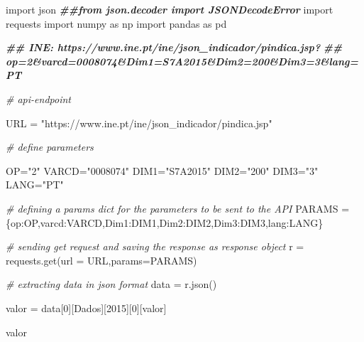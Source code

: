 \documentclass[
  12pt,
]{article}
\newenvironment{Shaded}{\begin{snugshade}}{\end{snugshade}}
\newcommand{\AttributeTok}[1]{\textcolor[rgb]{0.77,0.63,0.00}{#1}}
\newcommand{\CommentTok}[1]{\textcolor[rgb]{0.56,0.35,0.01}{\textit{#1}}}
\newcommand{\DecValTok}[1]{\textcolor[rgb]{0.00,0.00,0.81}{#1}}
\newcommand{\DocumentationTok}[1]{\textcolor[rgb]{0.56,0.35,0.01}{\textbf{\textit{#1}}}}
\newcommand{\FunctionTok}[1]{\textcolor[rgb]{0.00,0.00,0.00}{#1}}
\newcommand{\NormalTok}[1]{#1}
\newcommand{\OtherTok}[1]{\textcolor[rgb]{0.56,0.35,0.01}{#1}}
\newcommand{\SpecialCharTok}[1]{\textcolor[rgb]{0.00,0.00,0.00}{#1}}
\newcommand{\StringTok}[1]{\textcolor[rgb]{0.31,0.60,0.02}{#1}}
\begin{document}
\begin{Shaded}
\begin{Highlighting}[]
\NormalTok{import json}
\DocumentationTok{\#\#from json.decoder import JSONDecodeError}
\NormalTok{import requests}
\NormalTok{import numpy as np}
\NormalTok{import pandas as pd}

\DocumentationTok{\#\# INE: https://www.ine.pt/ine/json\_indicador/pindica.jsp?}
\DocumentationTok{\#\# op=2\&varcd=0008074\&Dim1=S7A2015\&Dim2=200\&Dim3=3\&lang=PT}

\CommentTok{\# api{-}endpoint}

\NormalTok{URL }\OtherTok{=} \StringTok{"https://www.ine.pt/ine/json\_indicador/pindica.jsp"}

\CommentTok{\# define parameters}

\NormalTok{OP}\OtherTok{=}\StringTok{"2"}
\NormalTok{VARCD}\OtherTok{=}\StringTok{"0008074"}
\NormalTok{DIM1}\OtherTok{=}\StringTok{"S7A2015"}
\NormalTok{DIM2}\OtherTok{=}\StringTok{"200"}
\NormalTok{DIM3}\OtherTok{=}\StringTok{"3"}
\NormalTok{LANG}\OtherTok{=}\StringTok{"PT"}


\CommentTok{\# defining a params dict for the parameters to be sent to the API}
\NormalTok{PARAMS }\OtherTok{=}\NormalTok{ \{}\StringTok{\textquotesingle{}op\textquotesingle{}}\SpecialCharTok{:}\NormalTok{OP,}\StringTok{\textquotesingle{}varcd\textquotesingle{}}\SpecialCharTok{:}\NormalTok{VARCD,}\StringTok{\textquotesingle{}Dim1\textquotesingle{}}\SpecialCharTok{:}\NormalTok{DIM1,}\StringTok{\textquotesingle{}Dim2\textquotesingle{}}\SpecialCharTok{:}\NormalTok{DIM2,}\StringTok{\textquotesingle{}Dim3\textquotesingle{}}\SpecialCharTok{:}\NormalTok{DIM3,}\StringTok{\textquotesingle{}lang\textquotesingle{}}\SpecialCharTok{:}\NormalTok{LANG\}}

\CommentTok{\# sending get request and saving the response as response object}
\NormalTok{r }\OtherTok{=} \FunctionTok{requests.get}\NormalTok{(}\AttributeTok{url =}\NormalTok{ URL,}\AttributeTok{params=}\NormalTok{PARAMS)}

\CommentTok{\# extracting data in json format}
\NormalTok{data }\OtherTok{=} \FunctionTok{r.json}\NormalTok{()}

\NormalTok{valor }\OtherTok{=}\NormalTok{ data[}\DecValTok{0}\NormalTok{][}\StringTok{\textquotesingle{}Dados\textquotesingle{}}\NormalTok{][}\StringTok{\textquotesingle{}2015\textquotesingle{}}\NormalTok{][}\DecValTok{0}\NormalTok{][}\StringTok{\textquotesingle{}valor\textquotesingle{}}\NormalTok{]}

\NormalTok{valor}


\end{Highlighting}
\end{Shaded}
\end{document}
